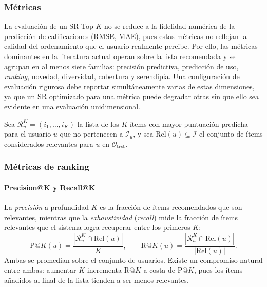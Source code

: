 \subsubsection{Métricas} \label{sec:metrics}

La evaluación de un SR Top-$K$ no se reduce a la fidelidad numérica de la predicción de calificaciones (RMSE, MAE), pues estas métricas no reflejan la calidad del ordenamiento que el usuario realmente percibe. Por ello, las métricas dominantes en la literatura actual operan sobre la lista recomendada y se agrupan en al menos siete familias: precisión predictiva, predicción de uso, \textit{ranking}, novedad, diversidad, cobertura y serendipia. Una configuración de evaluación rigurosa debe reportar simultáneamente varias de estas dimensiones, ya que un SR optimizado para una métrica puede degradar otras sin que ello sea evidente en una evaluación unidimensional.

Sea $\mathcal{R}_u^K = (i_1, \ldots, i_K)$ la lista de los $K$ ítems con mayor puntuación predicha para el usuario $u$ que no pertenecen a $\mathcal{I}_u$, y sea $\text{Rel}(u) \subseteq \mathcal{I}$ el conjunto de ítems considerados relevantes para $u$ en $\mathcal{O}_\text{test}$.

\subsubsection{Métricas de ranking} \label{subsubsec:ranking_metrics}

\paragraph{Precision@K y Recall@K}
La \textit{precisión} a profundidad $K$ es la fracción de ítems recomendados que son relevantes, mientras que la \textit{exhaustividad} (\textit{recall}) mide la fracción de ítems relevantes que el sistema logra recuperar entre los primeros $K$:
\begin{equation} \label{eq:precision_recall}
	\text{P@}K(u) = \frac{|\mathcal{R}_u^K \cap \text{Rel}(u)|}{K}, \qquad \text{R@}K(u) = \frac{|\mathcal{R}_u^K \cap \text{Rel}(u)|}{|\text{Rel}(u)|}.
\end{equation}
Ambas se promedian sobre el conjunto de usuarios. Existe un compromiso natural entre ambas: aumentar $K$ incrementa $\text{R@}K$ a costa de $\text{P@}K$, pues los ítems añadidos al final de la lista tienden a ser menos relevantes.

